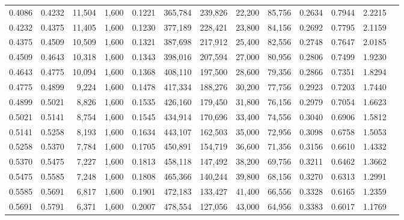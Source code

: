 \begin{tabular}{rrrrrrrrrrrrr}
0.4086 & 0.4232 & 11,504 & 1,600 &                                     0.1221 & 365,784 & 239,826 &  22,200 &  85,756 & 0.2634 & 0.7944 & 2.2215 \\
0.4232 & 0.4375 & 11,405 & 1,600 &                                     0.1230 & 377,189 & 228,421 &  23,800 &  84,156 & 0.2692 & 0.7795 & 2.1159 \\
0.4375 & 0.4509 & 10,509 & 1,600 &                                     0.1321 & 387,698 & 217,912 &  25,400 &  82,556 & 0.2748 & 0.7647 & 2.0185 \\
0.4509 & 0.4643 & 10,318 & 1,600 &                                     0.1343 & 398,016 & 207,594 &  27,000 &  80,956 & 0.2806 & 0.7499 & 1.9230 \\
0.4643 & 0.4775 & 10,094 & 1,600 &                                     0.1368 & 408,110 & 197,500 &  28,600 &  79,356 & 0.2866 & 0.7351 & 1.8294 \\
0.4775 & 0.4899 &  9,224 & 1,600 &                                     0.1478 & 417,334 & 188,276 &  30,200 &  77,756 & 0.2923 & 0.7203 & 1.7440 \\
0.4899 & 0.5021 &  8,826 & 1,600 &                                     0.1535 & 426,160 & 179,450 &  31,800 &  76,156 & 0.2979 & 0.7054 & 1.6623 \\
0.5021 & 0.5141 &  8,754 & 1,600 &                                     0.1545 & 434,914 & 170,696 &  33,400 &  74,556 & 0.3040 & 0.6906 & 1.5812 \\
0.5141 & 0.5258 &  8,193 & 1,600 &                                     0.1634 & 443,107 & 162,503 &  35,000 &  72,956 & 0.3098 & 0.6758 & 1.5053 \\
0.5258 & 0.5370 &  7,784 & 1,600 &                                     0.1705 & 450,891 & 154,719 &  36,600 &  71,356 & 0.3156 & 0.6610 & 1.4332 \\
0.5370 & 0.5475 &  7,227 & 1,600 &                                     0.1813 & 458,118 & 147,492 &  38,200 &  69,756 & 0.3211 & 0.6462 & 1.3662 \\
0.5475 & 0.5585 &  7,248 & 1,600 &                                     0.1808 & 465,366 & 140,244 &  39,800 &  68,156 & 0.3270 & 0.6313 & 1.2991 \\
0.5585 & 0.5691 &  6,817 & 1,600 &                                     0.1901 & 472,183 & 133,427 &  41,400 &  66,556 & 0.3328 & 0.6165 & 1.2359 \\
0.5691 & 0.5791 &  6,371 & 1,600 &                                     0.2007 & 478,554 & 127,056 &  43,000 &  64,956 & 0.3383 & 0.6017 & 1.1769 \\

\end{tabular}
